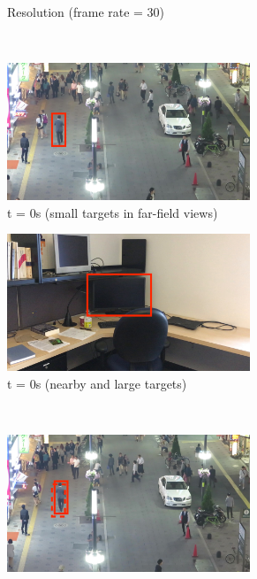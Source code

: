 \begin{figure}
\begin{subfigure}{0.5\textwidth}
    \caption{Resolution (frame rate = 30)}
    \label{fig:mobile-resolution}
  \end{subfigure}
  \\\vspace{1em}
  \begin{subfigure}{0.5\textwidth}
    \centering
    \includegraphics[width=0.8\textwidth]{figures/mot-1.jpg}
    \caption{t = 0s (small targets in far-field views)}
  \end{subfigure}%
  \begin{subfigure}{0.5\textwidth}
    \centering
    \includegraphics[width=0.8\textwidth]{figures/darknet-1.jpg}
    \caption{t = 0s (nearby and large targets)}
  \end{subfigure}
  \\\vspace{1em}
  \begin{subfigure}{0.5\textwidth}
    \centering
    \includegraphics[width=0.8\textwidth]{figures/mot-2.jpg}

\end{subfigure}
\end{figure}
